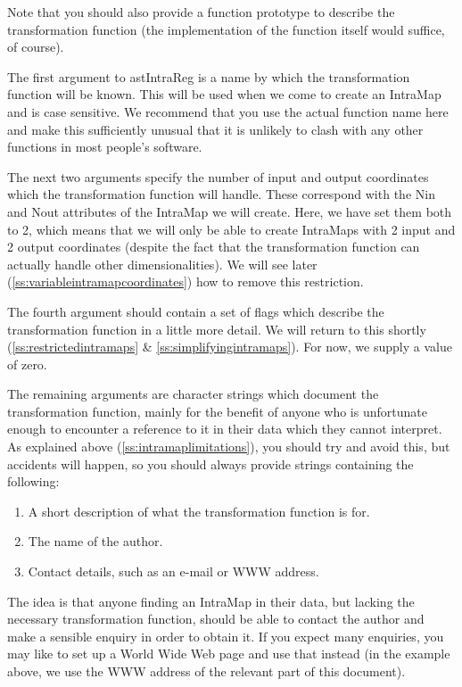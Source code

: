 \documentclass[twoside,11pt]{article}
\newcommand{\htmlref}[2]{#1}
\newcommand{\secref}[1]{\S\ref{#1}}
\renewcommand{\secref}[1]{\ref{#1}}
\begin{document}
Note that you should also provide a function prototype to describe the
transformation function (the implementation of the function itself
would suffice, of course).

The first argument to astIntraReg is a name by which the
transformation function will be known. This will be used when we come
to create an \htmlref{IntraMap}{IntraMap} and is case sensitive. We recommend that you use
the actual function name here and make this sufficiently unusual that
it is unlikely to clash with any other functions in most people's
software.

The next two arguments specify the number of input and output
coordinates which the transformation function will handle. These
correspond with the \htmlref{Nin}{Nin} and \htmlref{Nout}{Nout} attributes of the IntraMap we will
create. Here, we have set them both to 2, which means that we will
only be able to create IntraMaps with 2 input and 2 output coordinates
(despite the fact that the transformation function can actually handle
other dimensionalities). We will see later
(\secref{ss:variableintramapcoordinates}) how to remove this
restriction.

The fourth argument should contain a set of flags which describe the
transformation function in a little more detail. We will return to
this shortly (\secref{ss:restrictedintramaps} \&
\secref{ss:simplifyingintramaps}). For now, we supply a value of zero.

The remaining arguments are character strings which document the
transformation function, mainly for the benefit of anyone who is
unfortunate enough to encounter a reference to it in their data which
they cannot interpret. As explained above
(\secref{ss:intramaplimitations}), you should try and avoid this, but
accidents will happen, so you should always provide strings containing
the following:

\begin{enumerate}
\item A short description of what the transformation function is for.
\item The name of the author.
\item Contact details, such as an e-mail or WWW address.
\end{enumerate}

The idea is that anyone finding an IntraMap in their data, but lacking
the necessary transformation function, should be able to contact the
author and make a sensible enquiry in order to obtain it. If you
expect many enquiries, you may like to set up a World Wide Web page
and use that instead (in the example above, we use the WWW address of
the relevant part of this document).
\end{document}
